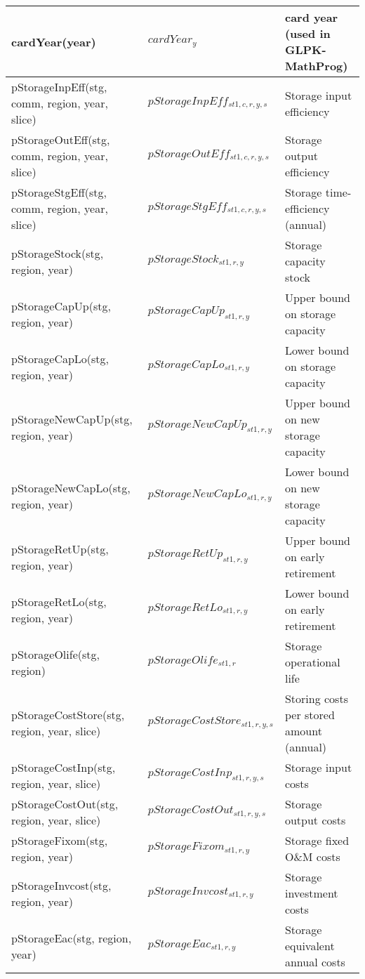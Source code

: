 \documentclass{article}
\begin{document}
\begin{longtable}{|p{10cm}|p{5cm}|p{9cm}|}
 \hline
cardYear(year) & $cardYear_{y}$ & card year (used in GLPK-MathProg) \\
 \hline
pStorageInpEff(stg, comm, region, year, slice) & $pStorageInpEff_{st1,c,r,y,s}$ & Storage input efficiency \\
 \hline
pStorageOutEff(stg, comm, region, year, slice) & $pStorageOutEff_{st1,c,r,y,s}$ & Storage output efficiency \\
 \hline
pStorageStgEff(stg, comm, region, year, slice) & $pStorageStgEff_{st1,c,r,y,s}$ & Storage time-efficiency (annual) \\
 \hline
pStorageStock(stg, region, year) & $pStorageStock_{st1,r,y}$ & Storage capacity stock \\
 \hline
pStorageCapUp(stg, region, year) & $pStorageCapUp_{st1,r,y}$ & Upper bound on storage capacity \\
 \hline
pStorageCapLo(stg, region, year) & $pStorageCapLo_{st1,r,y}$ & Lower bound on storage capacity \\
 \hline
pStorageNewCapUp(stg, region, year) & $pStorageNewCapUp_{st1,r,y}$ & Upper bound on new storage capacity \\
 \hline
pStorageNewCapLo(stg, region, year) & $pStorageNewCapLo_{st1,r,y}$ & Lower bound on new storage capacity \\
 \hline
pStorageRetUp(stg, region, year) & $pStorageRetUp_{st1,r,y}$ & Upper bound on early retirement \\
 \hline
pStorageRetLo(stg, region, year) & $pStorageRetLo_{st1,r,y}$ & Lower bound on early retirement \\
 \hline
pStorageOlife(stg, region) & $pStorageOlife_{st1,r}$ & Storage operational life \\
 \hline
pStorageCostStore(stg, region, year, slice) & $pStorageCostStore_{st1,r,y,s}$ & Storing costs per stored amount (annual) \\
 \hline
pStorageCostInp(stg, region, year, slice) & $pStorageCostInp_{st1,r,y,s}$ & Storage input costs \\
 \hline
pStorageCostOut(stg, region, year, slice) & $pStorageCostOut_{st1,r,y,s}$ & Storage output costs \\
 \hline
pStorageFixom(stg, region, year) & $pStorageFixom_{st1,r,y}$ & Storage fixed O\&M costs \\
 \hline
pStorageInvcost(stg, region, year) & $pStorageInvcost_{st1,r,y}$ & Storage investment costs \\
 \hline
pStorageEac(stg, region, year) & $pStorageEac_{st1,r,y}$ & Storage equivalent annual costs \\

\end{longtable}
\end{document}
